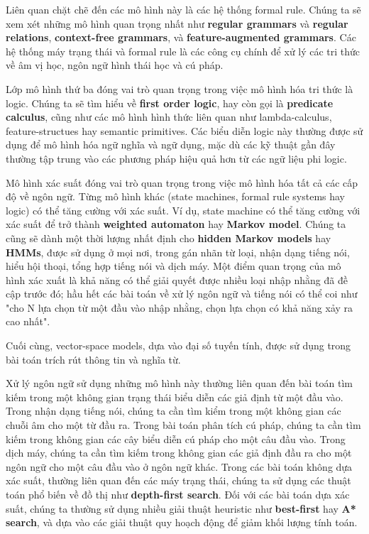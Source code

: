Liên quan chặt chẽ đến các mô hình này là các hệ thống formal rule. Chúng ta sẽ xem xét những mô hình quan trọng nhất như \textbf{regular grammars} và \textbf{regular relations}, \textbf{context-free grammars}, và \textbf{feature-augmented grammars}. Các hệ thống máy trạng thái và formal rule là các công cụ chính để xử lý các tri thức về âm vị học, ngôn ngữ hình thái học và cú pháp.

Lớp mô hình thứ ba đóng vai trò quan trọng trong việc mô hình hóa tri thức là logic. Chúng ta sẽ tìm hiểu về \textbf{first order logic}, hay còn gọi là \textbf{predicate calculus}, cũng như các mô hình hình thức liên quan như lambda-calculus, feature-structues hay semantic primitives. Các biểu diễn logic này thường được sử dụng để mô hình hóa ngữ nghĩa và ngữ dụng, mặc dù các kỹ thuật gần đây thường tập trung vào các phương pháp hiệu quả hơn từ các ngữ liệu phi logic.

Mô hình xác suất đóng vai trò quan trọng trong việc mô hình hóa tất cả các cấp độ về ngôn ngữ. Từng mô hình khác (state machines, formal rule systems hay logic) có thể tăng cường với xác suất. Ví dụ, state machine có thể tăng cường với xác suất để trở thành \textbf{weighted automaton} hay \textbf{Markov model}. Chúng ta cũng sẽ dành một thời lượng nhất định cho \textbf{hidden Markov models} hay \textbf{HMMs}, được sử dụng ở mọi nơi, trong gán nhãn từ loại, nhận dạng tiếng nói, hiểu hội thoại, tổng hợp tiếng nói và dịch máy. Một điểm quan trọng của mô hình xác xuất là khả năng có thể giải quyết được nhiều loại nhập nhằng đã đề cập trước đó; hầu hết các bài toán về xử lý ngôn ngữ và tiếng nói có thể coi như "cho N lựa chọn từ một đầu vào nhập nhằng, chọn lựa chọn có khả năng xảy ra cao nhất".

Cuối cùng, vector-space models, dựa vào đại số tuyến tính, được sử dụng trong bài toán trích rút thông tin và nghĩa từ.

Xử lý ngôn ngữ sử dụng những mô hình này thường liên quan đến bài toán tìm kiếm trong một không gian trạng thái biểu diễn các giả định từ một đầu vào. Trong nhận dạng tiếng nói, chúng ta cần tìm kiểm trong một không gian các chuỗi âm cho một từ đầu ra. Trong bài toán phân tích cú pháp, chúng ta cần tìm kiếm trong không gian các cây biểu diễn cú pháp cho một câu đầu vào. Trong dịch máy, chúng ta cần tìm kiếm trong không gian các giả định đầu ra cho một ngôn ngữ cho một câu đầu vào ở ngôn ngữ khác. Trong các bài toán không dựa xác suất, thường liên quan đến các máy trạng thái, chúng ta sử dụng các thuật toán phổ biến về đồ thị như \textbf{depth-first search}. Đối với các bài toán dựa xác suất, chúng ta thường sử dụng nhiều giải thuật heuristic như \textbf{best-first} hay \textbf{A* search}, và dựa vào các giải thuật quy hoạch động để giảm khối lượng tính toán.

